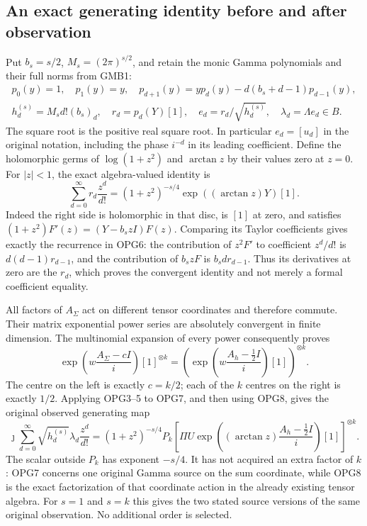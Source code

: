 \subsection{An exact generating identity before and after observation}
Put $b_s=s/2$, $M_s=(2\pi)^{s/2}$, and retain the monic Gamma
polynomials and their full norms from GMB1:
\[
\begin{gathered}
 p_0(y)=1,\quad p_1(y)=y,\quad
 p_{d+1}(y)=yp_d(y)-d(b_s+d-1)p_{d-1}(y),\\
 h_d^{(s)}=M_s d!(b_s)_d,\quad
 r_d=p_d(Y)[1],\quad e_d=r_d/\sqrt{h_d^{(s)}},\quad
 \lambda_d=\Lambda e_d\in B.
\end{gathered}\tag{OPG6}
\]
The square root is the positive real square root. In particular
$e_d=[u_d]$ in the original notation, including the phase $i^{-d}$
in its leading coefficient. Define the holomorphic germs of
$\log(1+z^2)$ and $\arctan z$ by their values zero at $z=0$.
For $|z|<1$, the exact algebra-valued identity is
\[
 \sum_{d=0}^{\infty}r_d\frac{z^d}{d!}
 = (1+z^2)^{-s/4}\exp((\arctan z)Y)[1].
 \tag{OPG7}
\]
Indeed the right side is holomorphic in that disc, is $[1]$ at
zero, and satisfies
$(1+z^2)F'(z)=(Y-b_s zI)F(z)$.
Comparing its Taylor coefficients gives exactly the recurrence
in OPG6: the contribution of $z^2F'$ to coefficient $z^d/d!$
is $d(d-1)r_{d-1}$, and the contribution of $b_szF$ is
$b_sd r_{d-1}$. Thus its derivatives at zero are the $r_d$,
which proves the convergent identity and not merely a formal
coefficient equality.

All factors of $A_\Sigma$ act on different tensor coordinates
and therefore commute. Their matrix exponential power series
are absolutely convergent in finite dimension. The multinomial
expansion of every power consequently proves
\[
 \exp\left(w\frac{A_\Sigma-cI}{i}\right)[1]^{\otimes k}
 =\left(\exp\left(w\frac{A_h-\tfrac12I}{i}\right)[1]\right)^{\otimes k}.
 \tag{OPG8}
\]
The centre on the left is exactly $c=k/2$; each of the $k$
centres on the right is exactly $1/2$. Applying OPG3--5 to OPG7,
and then using OPG8, gives the original observed generating map
\[
\boxed{
 \jmath\sum_{d=0}^{\infty}\sqrt{h_d^{(s)}}\lambda_d\frac{z^d}{d!}
 = (1+z^2)^{-s/4}P_k
 \left[\Pi U\exp\left((\arctan z)
                \frac{A_h-\tfrac12I}{i}\right)[1]\right]^{\otimes k}.
}\tag{OPG9}
\]
The scalar outside $P_k$ has exponent $-s/4$. It has not acquired
an extra factor of $k$: OPG7 concerns one original Gamma source
on the sum coordinate, while OPG8 is the exact factorization of
that coordinate action in the already existing tensor algebra.
For $s=1$ and $s=k$ this gives the two stated source versions of
the same original observation. No additional order is selected.

